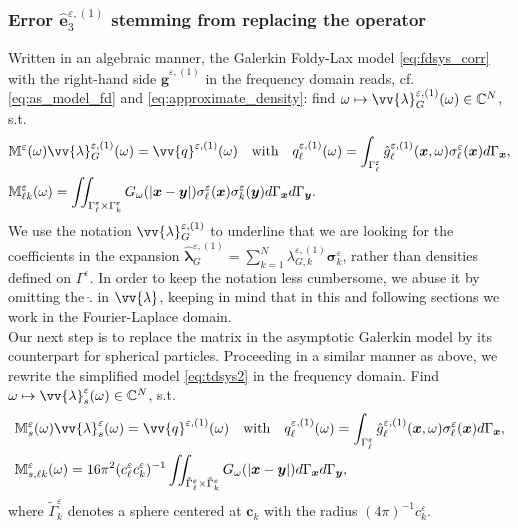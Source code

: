 \documentclass[]{article}
\numberwithin{equation}{section}
\numberwithin{theorem}{section}
\numberwithin{lemma}{section}
\numberwithin{corollary}{section}
\numberwithin{proposition}{section}
\numberwithin{definition}{section}
\newcommand{\bx}{\boldsymbol{x}}
\newcommand{\by}{\boldsymbol{y}}
\newcommand{\bc}{\boldsymbol{c}}
\newcommand{\blambda}{\boldsymbol{\lambda}}
\newcommand{\re}{\varepsilon}
\renewcommand{\vec}{\boldsymbol}
\begin{document}
	\subsubsection{Error $\hat{\vec{e}}_3^{\re, (1)}$ stemming from replacing the operator}
	\label{sec:ere3}
	Written in an algebraic manner, the Galerkin Foldy-Lax model \eqref{eq:fdsys_corr} with the right-hand side $\hat{{\boldsymbol{g}}}^{\re,(1)}$ in the frequency domain reads, cf. \eqref{eq:as_model_fd} and  \eqref{eq:approximate_density}: find $\omega\mapsto \vv{\lambda}^{\re,(1)}_G(\omega)\in\mathbb{C}^N$, s.t.  
	\begin{equation}
		\label{eq:problem_M_G}
		\begin{aligned}
			&\mathbb{M}^{\varepsilon}(\omega) \vv{\lambda}^{\re, (1)}_G (\omega)=\vv{q}^{\varepsilon,(1)}(\omega) \quad \text{with} \quad q^{\varepsilon,(1)}_{\ell }(\omega)= \int_{\Gamma^{\varepsilon}_{\ell} }\hat{{g}}^{\varepsilon,(1)}_{\ell} (\bx, \omega){\sigma}_{\ell} ^{\varepsilon}(\bx)d\Gamma_{\bx},\\
			&\mathbb{M}^{\varepsilon}_{\ell k}(\omega)=\iint_{\Gamma^{\varepsilon}_{\ell}\times \Gamma^{\varepsilon}_k} G_{\omega}(|\bx-\by|)\sigma^{\varepsilon}_{\ell} (\bx)\sigma^{\varepsilon}_k(\by)d\Gamma_{\bx}d\Gamma_{\by}.
		\end{aligned} 
	\end{equation}
	We use the notation  $\vv{\lambda}_G^{\re,(1)}$ to underline that we are looking for the coefficients in the expansion ${\hat{\blambda}}_G^{\re,(1)}=\sum\limits_{k=1}^N \lambda_{G,k}^{\re,(1)}\vec{\sigma}_k^{\re}$, rather than densities defined on $\Gamma^{\re}$.  In order to keep the notation less cumbersome, we abuse it by omitting the $\hat{.}$ in $\vv{\lambda}$, keeping in mind that in this and following sections we work in the Fourier-Laplace domain. \\
	Our next step is to replace the matrix in the asymptotic Galerkin model by its counterpart for spherical particles. Proceeding in a similar manner as above, we rewrite the simplified model \eqref{eq:tdsys2} in the frequency domain. Find $\omega \mapsto \vv{\lambda}^{\re}_s(\omega) \in \mathbb{C}^N$, s.t. 
	\begin{equation}
		\label{eq:problem_M_s}
		\begin{aligned}
			&\mathbb{M}^{\re}_s(\omega) \vv{\lambda}^{\re}_s(\omega) = \vv{q}^{\re, (1)}(\omega) \quad \text{with} \quad q^{\re, (1)}_{\ell}(\omega) = \int_{\Gamma^{\varepsilon}_{\ell} }\hat{g}^{\varepsilon,(1)}_{\ell} (\bx, \omega){\sigma}_{\ell} ^{\varepsilon}(\bx)d\Gamma_{\bx},\\
			&\mathbb{M}^{\re}_{s, \ell k}(\omega) = 16  \pi^2 (c^{\re}_{\ell} c^{\re}_k)^{-1} \iint_{\tilde{\Gamma}^{\re}_{\ell} \times \tilde{\Gamma}^{\re}_k} G_{\omega}(|\bx-\by|) d\Gamma_{\bx}d\Gamma_{\by}, 
		\end{aligned}
	\end{equation}
	where $\tilde{\Gamma}^{\re}_k$ denotes a sphere centered at $\bc_k$ with the radius $ (4 \pi )^{-1} c^{\re}_k$.
	
\end{document}
